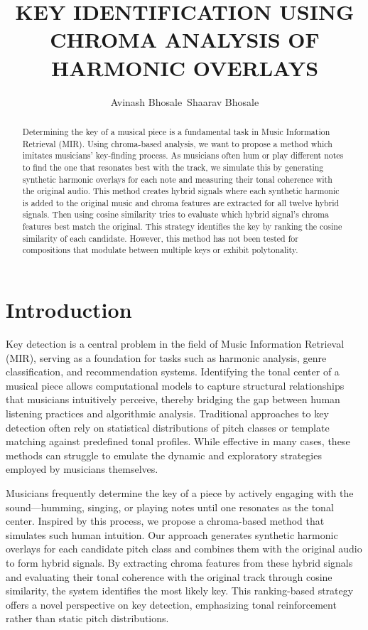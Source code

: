 \documentclass[10pt,twocolumn]{article}
\title{KEY IDENTIFICATION USING CHROMA ANALYSIS OF HARMONIC OVERLAYS}
\author{Avinash Bhosale\, \orcidlink{0009-0002-4276-8109} Shaarav Bhosale \orcidlink{0009-0009-8207-2887}}
\makeatletter
\renewcommand{\maketitle}{
  \twocolumn[
    \begin{center}
      {\large\bfseries\@title\par}
      \vspace{6pt}
      {\normalsize\@author\par}
      \vspace{12pt}
    \end{center}
  ]
}
\makeatother
\begin{document}
\maketitle

\begin{abstract}
Determining the key of a musical piece is a fundamental task in Music Information Retrieval (MIR).
Using chroma-based analysis, we want to propose a method which imitates musicians’ key-finding process.
As musicians often hum or play different notes to find the one that resonates best with the track,
we simulate this by generating synthetic harmonic overlays for each note and measuring their tonal coherence with the original audio.
This method creates hybrid signals where each synthetic harmonic is added to the original music and chroma features are extracted for all twelve hybrid signals.
Then using cosine similarity tries to evaluate which hybrid signal’s chroma features best match the original.
This strategy identifies the key by ranking the cosine similarity of each candidate.
However, this method has not been tested for compositions that modulate between multiple keys or exhibit polytonality.
\end{abstract}

\section{Introduction}\label{sec:introduction}
Key detection is a central problem in the field of Music Information Retrieval (MIR), serving as a foundation for tasks such as harmonic analysis, genre classification, and recommendation systems.
Identifying the tonal center of a musical piece allows computational models to capture structural relationships that musicians intuitively perceive, thereby bridging the gap between human listening practices and algorithmic analysis.
Traditional approaches to key detection often rely on statistical distributions of pitch classes or template matching against predefined tonal profiles.
While effective in many cases, these methods can struggle to emulate the dynamic and exploratory strategies employed by musicians themselves.

Musicians frequently determine the key of a piece by actively engaging with the sound—humming, singing, or playing notes until one resonates as the tonal center.
Inspired by this process, we propose a chroma-based method that simulates such human intuition.
Our approach generates synthetic harmonic overlays for each candidate pitch class and combines them with the original audio to form hybrid signals.
By extracting chroma features from these hybrid signals and evaluating their tonal coherence with the original track through cosine similarity, the system identifies the most likely key.
This ranking-based strategy offers a novel perspective on key detection, emphasizing tonal reinforcement rather than static pitch distributions.
\end{document}

